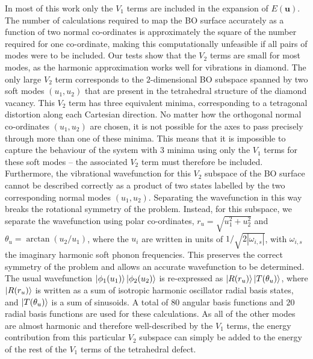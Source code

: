 \documentclass[aps,showpacs,prb,reprint,superscriptaddress,longbibliography]{revtex4-1}
\begin{document}
In most of this work only the $V_1$ terms are included in the
expansion of $E(\mathbf{u})$. The number of calculations required to
map the BO surface accurately as a function of two normal co-ordinates
is approximately the square of the number required for one
co-ordinate, making this computationally unfeasible if all pairs of
modes were to be included. Our tests show that the $V_2$ terms are
small for most modes, as the harmonic approximation works well for
vibrations in diamond.\cite{monserrat_anharmonic_2013} The only large
$V_2$ term corresponds to the $2$-dimensional BO subspace spanned by
two soft modes $(u_1,u_2)$ that are present in the tetrahedral
structure of the diamond vacancy. This $V_2$ term has three equivalent
minima, corresponding to a tetragonal distortion along each Cartesian
direction.  No matter how the orthogonal normal co-ordinates
$(u_1,u_2)$ are chosen, it is not possible for the axes to pass
precisely through more than one of these minima. This means that it is
impossible to capture the behaviour of the system with $3$ minima
using only the $V_1$ terms for these soft modes -- the associated
$V_2$ term must therefore be included.  Furthermore, the vibrational
wavefunction for this $V_2$ subspace of the BO surface cannot be
described correctly as a product of two states labelled by the two
corresponding normal modes $(u_1,u_2)$. Separating the wavefunction in
this way breaks the rotational symmetry of the problem.  Instead, for
this subspace, we separate the wavefunction using polar co-ordinates,
$r_u = \sqrt{u_1^2+u_2^2}$ and $\theta_u = \arctan(u_2/u_1)$, where
the $u_i$ are written in units of $1/\sqrt{2|\omega_{i,s}|}$, with
$\omega_{i,s}$ the imaginary harmonic soft phonon frequencies. This
preserves the correct symmetry of the problem and allows an accurate
wavefunction to be determined.  The usual wavefunction
$\ket{\phi_{1} (u_{1})}\ket{\phi_{2} (u_{2})}$ is re-expressed as
$\ket{R(r_u)}\ket{T(\theta_u)}$, where $\ket{R(r_u)}$ is written as a
sum of isotropic harmonic oscillator radial basis states, and
$\ket{T(\theta_u)}$ is a sum of sinusoids. A total of $80$ angular
basis functions and $20$ radial basis functions are used for these
calculations.  As all of the other modes are almost harmonic and
therefore well-described by the $V_1$ terms, the energy contribution
from this particular $V_2$ subspace can simply be added to the energy
of the rest of the $V_1$ terms of the tetrahedral defect.
\end{document}
